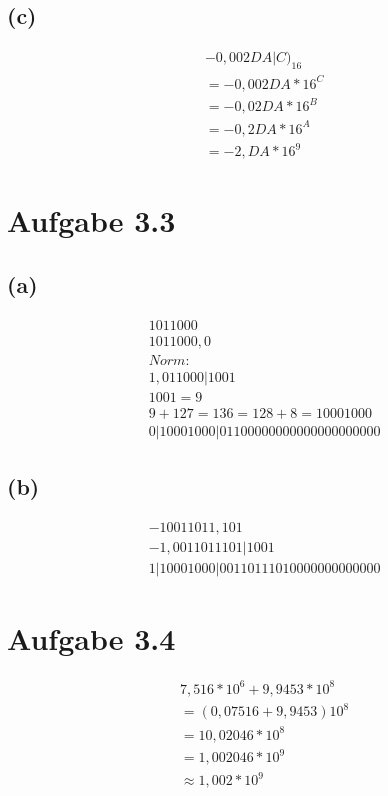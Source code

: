 \documentclass[12pt]{article}
\begin{document}
\subsection{(c)}
\begin{align}
&-0,002DA|C)_{16}\\
&= -0,002DA * 16^C\\
&= -0,02DA * 16^B\\
&= -0,2DA * 16^A\\
&= -2,DA * 16^9
\end{align}

\section{Aufgabe 3.3}

\subsection{(a)}
\begin{align}
&101 1000\\
&1011000,0\\
&Norm:\\
&1,011000 | 1001\\
&1001 = 9\\
&9 + 127 = 136 = 128 + 8 = 10001000\\
&0 | 10001000 | 01100000000000000000000
\end{align}

\subsection{(b)}
\begin{align}
&-10011011,101\\
&-1,0011011101 | 1001\\
&1 | 10001000 | 00110111010000000000000
\end{align}

\section{Aufgabe 3.4}
\begin{align}
&7,516 * 10^6 + 9,9453 * 10^8\\
&= (0,07516 + 9,9453) 10^8\\
&= 10,02046 * 10^8\\
&= 1,002046 * 10^9\\
&\approx 1,002 * 10^9
\end{align}
\end{document}
